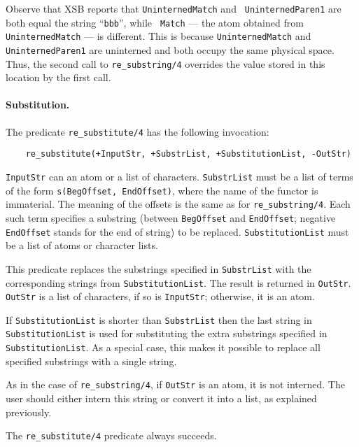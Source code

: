 Observe that XSB reports that {\tt UninternedMatch} and {\tt
UninternedParen1} are both equal the string ``{\tt bbb}'', while {\tt
Match} --- the atom obtained from {\tt UninternedMatch} --- is different.
This is because {\tt UninternedMatch} and {\tt UninternedParen1} are
uninterned and both occupy the same physical space. Thus, the second call
to \verb|re_substring/4| overrides the value stored in this location by the
first call.

\paragraph{Substitution.}
The predicate \verb|re_substitute/4| has the following invocation:
\begin{verbatim}
    re_substitute(+InputStr, +SubstrList, +SubstitutionList, -OutStr)  
\end{verbatim}
{\tt InputStr} can an atom or a list of characters.  {\tt SubstrList} must
be a list of terms of the form {\tt s(BegOffset, EndOffset)}, where the name
of the functor is immaterial.  The meaning of the offsets is the same as
for {\tt re\_substring/4}.  Each such term specifies a substring (between
{\tt BegOffset} and {\tt EndOffset}; negative {\tt EndOffset} stands for
the end of string) to be replaced.  {\tt SubstitutionList} must be a list
of atoms or character lists.

This predicate replaces the substrings specified in {\tt SubstrList} with
the corresponding strings from {\tt SubstitutionList}.  The result is
returned in {\tt OutStr}. {\tt OutStr} is a list of characters, if so is
{\tt InputStr}; otherwise, it is an atom.

If {\tt SubstitutionList} is shorter than {\tt SubstrList} then the last
string in {\tt SubstitutionList} is used for substituting the extra
substrings specified in {\tt SubstitutionList}. As a special case, this
makes it possible to replace all specified substrings with a single string.

As in the case of {\tt re\_substring/4}, if {\tt OutStr} is an atom, it is
not interned.  The user should either intern this string or convert it into
a list, as explained previously.

The \verb|re_substitute/4| predicate always succeeds.

